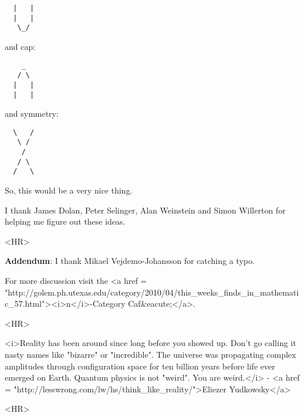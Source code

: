 \begin{verbatim}
  |   |
  |   |
   \_/
\end{verbatim}
    
and cap:
\begin{verbatim}
    _
   / \
  |   |
  |   |
\end{verbatim}
    
and symmetry:

\begin{verbatim}
  \   /
   \ /
    /
   / \
  /   \
\end{verbatim}
    
So, this would be a very nice thing.

I thank James Dolan, Peter Selinger,
Alan Weinstein and Simon Willerton for 
helping me figure out these ideas.


<HR>


\textbf{Addendum}: I thank Mikael Vejdemo-Johansson for catching a typo.

For more discussion visit the
<a href = "http://golem.ph.utexas.edu/category/2010/04/this_weeks_finds_in_mathematic_57.html"><i>n</i>-Category Caf&eacute;</a>.

<HR>


<i>Reality has been around since long before you showed up.  Don't go
calling it nasty names like "bizarre" or
"incredible".  The universe was propagating complex
amplitudes through configuration space for ten billion years before
life ever emerged on Earth.  Quantum physics is not "weird".
You are weird.</i> - <a href = "http://lesswrong.com/lw/hs/think_like_reality/">Eliezer Yudkowsky</a>

<HR>



